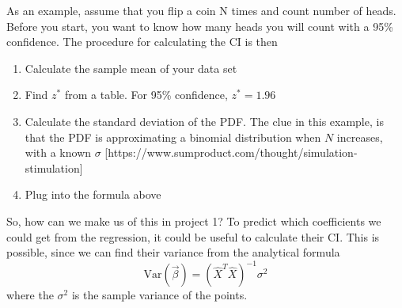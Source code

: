 As an example, assume that you flip a coin N times and count number of heads. Before you start, you want to know how many heads you will count with a 95\% confidence. The procedure for calculating the CI is then
\begin{enumerate}
	\item Calculate the sample mean of your data set
	\item Find $z^*$ from a table. For 95\% confidence, $z^*=1.96$
	\item Calculate the standard deviation of the PDF. The clue in this example, is that the PDF is approximating a binomial distribution when $N$ increases, with a known $\sigma$ [https://www.sumproduct.com/thought/simulation-stimulation] 
	\item Plug into the formula above
\end{enumerate}

So, how can we make us of this in project 1? To predict which coefficients we could get from the regression, it could be useful to calculate their CI. This is possible, since we can find their variance from the analytical formula
\begin{equation}
\text{Var}(\vec{\beta})=(\hat{X}^T\hat{X})^{-1}\sigma^2
\end{equation}
where the $\sigma^2$ is the sample variance of the points.